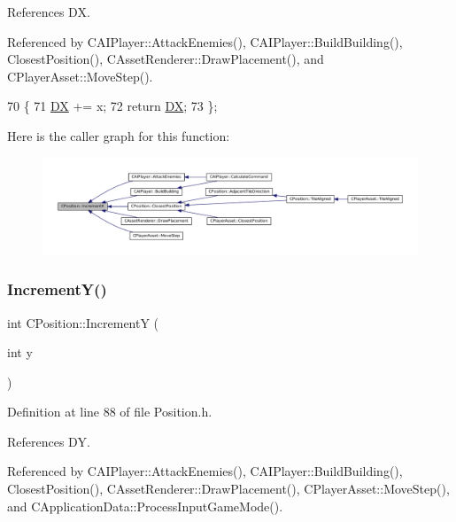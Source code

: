 References DX.



Referenced by C\+A\+I\+Player\+::\+Attack\+Enemies(), C\+A\+I\+Player\+::\+Build\+Building(), Closest\+Position(), C\+Asset\+Renderer\+::\+Draw\+Placement(), and C\+Player\+Asset\+::\+Move\+Step().


\begin{DoxyCode}
70                              \{
71             \hyperlink{classCPosition_a28445f9b872169715919074d82044eda}{DX} += x; 
72             \textcolor{keywordflow}{return} \hyperlink{classCPosition_a28445f9b872169715919074d82044eda}{DX};
73         \};
\end{DoxyCode}
Here is the caller graph for this function\+:\nopagebreak
\begin{figure}[H]
\begin{center}
\leavevmode
\includegraphics[width=350pt]{classCPosition_aa5955d67d5ab7ca74d80cb7303b6eaa9_icgraph}
\end{center}
\end{figure}
\hypertarget{classCPosition_a3f2a26798bb27b1252ff1be303b3adfc}{}\label{classCPosition_a3f2a26798bb27b1252ff1be303b3adfc} 
\subsubsection{\texorpdfstring{Increment\+Y()}{IncrementY()}}
{\footnotesize\ttfamily int C\+Position\+::\+IncrementY (\begin{DoxyParamCaption}\item[{int}]{y }\end{DoxyParamCaption})\hspace{0.3cm}{\ttfamily [inline]}}



Definition at line 88 of file Position.\+h.



References DY.



Referenced by C\+A\+I\+Player\+::\+Attack\+Enemies(), C\+A\+I\+Player\+::\+Build\+Building(), Closest\+Position(), C\+Asset\+Renderer\+::\+Draw\+Placement(), C\+Player\+Asset\+::\+Move\+Step(), and C\+Application\+Data\+::\+Process\+Input\+Game\+Mode().



